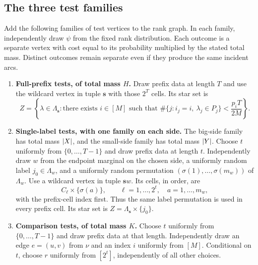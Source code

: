 \subsection{The three test families}

\begin{definition}
\label{def:tests}
Add the following families of test vertices to the rank graph.  In each
family, independently draw $\psi$ from the fixed rank distribution.  Each
outcome is a separate vertex with cost equal to its probability multiplied
by the stated total mass.  Distinct outcomes remain separate even if they
produce the same incident arcs.
\begin{enumerate}[label=\arabic*.,leftmargin=*]
  \item \textbf{Full-prefix tests, of total mass $H$.}
  \label{item:full-prefix-test}
  Draw prefix data at length $T$ and use the wildcard vertex in tuple
  $\mathbf s$ with those $2^T$ cells.  Its star set is
  \begin{equation}
    Z=\left\{\lambda\in\Lambda_{\mathbf s}:
      \text{there exists }i\in[M]\text{ such that }
      \#\{j:i_j=i,\ \lambda_j\in P_j\}
      <\frac{p_iT}{2M}\right\}.
    \label{eq:full-prefix-stars}
  \end{equation}

  \item \textbf{Single-label tests, with one family on each side.}
  \label{item:single-label-test}
  The big-side family has total mass $\lvert X\rvert$, and the small-side family
  has total mass $\lvert Y\rvert$.  Choose $t$ uniformly from
  $\{0,\ldots,T-1\}$ and draw prefix data at length $t$.  Independently
  draw $w$ from the endpoint marginal on the chosen side, a uniformly
  random label $j_0\in\Lambda_w$, and a uniformly random permutation
  $(\sigma(1),\ldots,\sigma(m_w))$ of $\Lambda_w$.  Use a wildcard vertex
  in tuple $\mathbf s w$.  Its cells, in order, are
  \[
    C_\ell\times\{\sigma(a)\},
    \qquad \ell=1,\ldots,2^t,\quad a=1,\ldots,m_w,
  \]
  with the prefix-cell index first.  Thus the same label permutation is
  used in every prefix cell.  Its star set is
  $Z=\Lambda_{\mathbf s}\times\{j_0\}$.

  \item \textbf{Comparison tests, of total mass $K$.}
  \label{item:comparison-test}
  Choose $t$ uniformly from $\{0,\ldots,T-1\}$ and draw prefix data at
  that length.  Independently draw an edge $e=(u,v)$ from $\nu$ and an
  index $i$ uniformly from $[M]$.  Conditional on $t$, choose $r$ uniformly
  from $[2^t]$, independently of all other choices.


\end{enumerate}
\end{definition}
